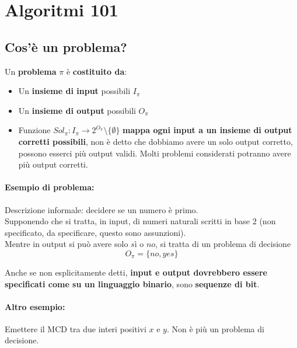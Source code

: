 
\section{Algoritmi 101}

\subsection{Cos'è un problema?} 

Un \textbf{problema} $\pi$ è \textbf{costituito da}:
\begin{itemize}
	\item Un \textbf{insieme di input} possibili $I_\pi$
	
	\item Un \textbf{insieme di output} possibili $O_\pi$
	
	\item Funzione $Sol_\pi: I_\pi \rightarrow 2^{O_\pi} \setminus \{\emptyset\}$ \textbf{mappa ogni input a un insieme di output corretti possibili}, non è detto che dobbiamo avere un solo output corretto, possono esserci più output validi. Molti problemi considerati potranno avere più output corretti.
\end{itemize}

\paragraph{Esempio di problema:} Descrizione informale: decidere se un numero è primo. \\

Supponendo che si tratta, in input, di numeri naturali scritti in base $2$ (non specificato, da specificare, questo sono assunzioni).\\
Mentre in output si può avere solo $sì$ o $no$, si tratta di un problema di decisione
$$ O_\pi = \{no, yes\} $$

Anche se non esplicitamente detti, \textbf{input e output dovrebbero essere specificati come su un linguaggio binario}, sono \textbf{sequenze di bit}.\\

\newpage

\paragraph{Altro esempio:} Emettere il MCD tra due interi positivi $x$ e $y$. Non è più un problema di decisione.\\

